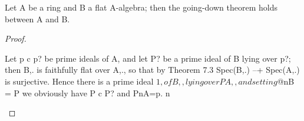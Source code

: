\begin{theorem}[Theorem 9.5]\label{mcrt-auto-theorem-9-5}
\begin{mathematicalrecord}
Let A be a ring and B a flat A-algebra; then the going-down
theorem holds between A and B.
\end{mathematicalrecord}
\end{theorem}
\begin{proof}
\begin{mathematicalrecord}
Let p c p? be prime ideals of A, and let P? be a prime ideal of B lying
over p?; then B,. is faithfully flat over A,., so that by Theorem 7.3
Spec(B,.) --+ Spec(A,.) is surjective. Hence there is a prime ideal $1,
of B,, lying over PA,, and setting $@nB = P we obviously have P c P?
and PnA=p.       n
\end{mathematicalrecord}
\end{proof}


